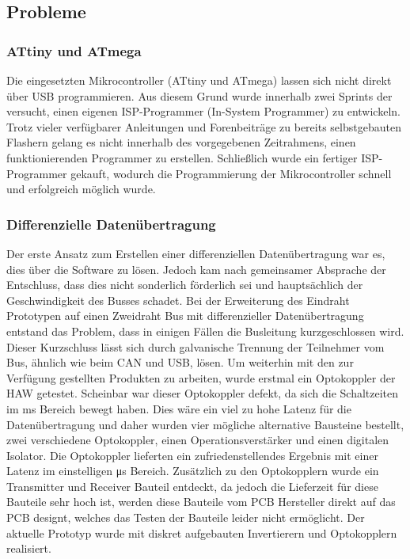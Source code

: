 \subsection{Probleme}
\subsubsection{ATtiny und ATmega}
Die eingesetzten Mikrocontroller (ATtiny und ATmega) lassen sich nicht direkt über USB programmieren. Aus diesem Grund wurde innerhalb zwei Sprints der versucht, einen eigenen ISP-Programmer (In-System Programmer) zu entwickeln. Trotz vieler verfügbarer Anleitungen und Forenbeiträge zu bereits selbstgebauten Flashern gelang es nicht innerhalb des vorgegebenen Zeitrahmens, einen funktionierenden Programmer zu erstellen. Schließlich wurde ein fertiger ISP-Programmer gekauft, wodurch die Programmierung der Mikrocontroller schnell und erfolgreich möglich wurde.

\subsubsection{Differenzielle Datenübertragung}
Der erste Ansatz zum Erstellen einer differenziellen Datenübertragung war es, dies über die Software zu lösen. Jedoch kam nach gemeinsamer Absprache der Entschluss, dass dies nicht sonderlich förderlich sei und hauptsächlich der Geschwindigkeit des Busses schadet. Bei der Erweiterung des Eindraht Prototypen auf einen Zweidraht Bus mit differenzieller Datenübertragung entstand das Problem, dass in einigen Fällen die Busleitung kurzgeschlossen wird. Dieser Kurzschluss lässt sich durch galvanische Trennung der Teilnehmer vom Bus, ähnlich wie beim CAN und USB, lösen. Um weiterhin mit den zur Verfügung gestellten Produkten zu arbeiten, wurde erstmal ein Optokoppler der HAW getestet. Scheinbar war dieser Optokoppler defekt, da sich die Schaltzeiten im \si{ms} Bereich bewegt haben. Dies wäre ein viel zu hohe Latenz für die Datenübertragung und daher wurden vier mögliche alternative Bausteine bestellt, zwei verschiedene Optokoppler, einen Operationsverstärker und einen digitalen Isolator. Die Optokoppler lieferten ein zufriedenstellendes Ergebnis mit einer Latenz im einstelligen \si{\micro\second} Bereich. Zusätzlich zu den Optokopplern wurde ein Transmitter und Receiver Bauteil entdeckt, da jedoch die Lieferzeit für diese Bauteile sehr hoch ist, werden diese Bauteile vom PCB Hersteller direkt auf das PCB designt, welches das Testen der Bauteile leider nicht ermöglicht. Der aktuelle Prototyp wurde mit diskret aufgebauten Invertierern und Optokopplern realisiert.

